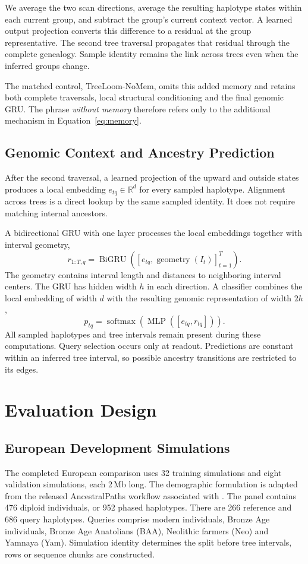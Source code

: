 \documentclass[letterpaper]{article}
\begin{document}
We average the two scan directions, average the resulting haplotype states within each current group, and subtract the group's current context vector. A learned output projection converts this difference to a residual at the group representative. The second tree traversal propagates that residual through the complete genealogy. Sample identity remains the link across trees even when the inferred groups change.

The matched control, TreeLoom-NoMem, omits this added memory and retains both complete traversals, local structural conditioning and the final genomic GRU. The phrase \emph{without memory} therefore refers only to the additional mechanism in Equation~\ref{eq:memory}.

\subsection{Genomic Context and Ancestry Prediction}
After the second traversal, a learned projection of the upward and outside states produces a local embedding $e_{tq}\in\mathbb{R}^{d}$ for every sampled haplotype. Alignment across trees is a direct lookup by the same sampled identity. It does not require matching internal ancestors.

A bidirectional GRU with one layer processes the local embeddings together with interval geometry,
\begin{equation}
r_{1:T,q}=\operatorname{BiGRU}
\left([e_{tq},\operatorname{geometry}(I_t)]_{t=1}^T\right).
\end{equation}
The geometry contains interval length and distances to neighboring interval centers. The GRU has hidden width $h$ in each direction. A classifier combines the local embedding of width $d$ with the resulting genomic representation of width $2h$,
\begin{equation}
p_{tq}=\operatorname{softmax}
\left(\operatorname{MLP}([e_{tq},r_{tq}])\right).
\end{equation}
All sampled haplotypes and tree intervals remain present during these computations. Query selection occurs only at readout. Predictions are constant within an inferred tree interval, so possible ancestry transitions are restricted to its edges.

\section{Evaluation Design}
\subsection{European Development Simulations}
The completed European comparison uses 32 training simulations and eight validation simulations, each 2\,Mb long. The demographic formulation is adapted from the released AncestralPaths workflow associated with \citet{eurasians2024}. The panel contains 476 diploid individuals, or 952 phased haplotypes. There are 266 reference and 686 query haplotypes. Queries comprise modern individuals, Bronze Age individuals, Bronze Age Anatolians (BAA), Neolithic farmers (Neo) and Yamnaya (Yam). Simulation identity determines the split before tree intervals, rows or sequence chunks are constructed.
\end{document}
